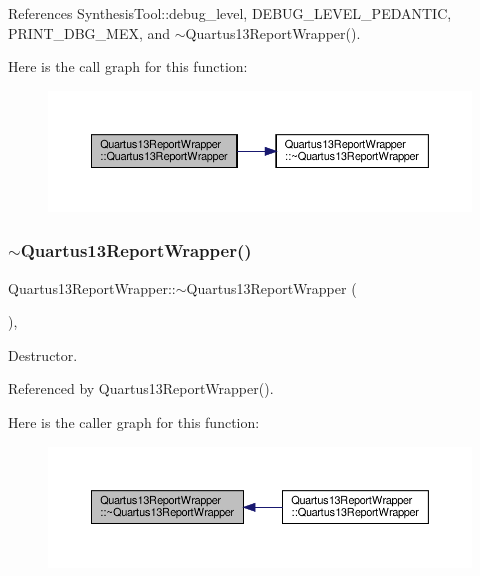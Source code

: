 References Synthesis\+Tool\+::debug\+\_\+level, D\+E\+B\+U\+G\+\_\+\+L\+E\+V\+E\+L\+\_\+\+P\+E\+D\+A\+N\+T\+IC, P\+R\+I\+N\+T\+\_\+\+D\+B\+G\+\_\+\+M\+EX, and $\sim$\+Quartus13\+Report\+Wrapper().

Here is the call graph for this function\+:
\nopagebreak
\begin{figure}[H]
\begin{center}
\leavevmode
\includegraphics[width=350pt]{d5/d0a/classQuartus13ReportWrapper_a3a425105ef70ba5ad1d78ab9f6e2538b_cgraph}
\end{center}
\end{figure}
\mbox{\label{classQuartus13ReportWrapper_a1747b7328bd537869aa4eb4a9d4c4ad7}} 
\subsubsection{\texorpdfstring{$\sim$\+Quartus13\+Report\+Wrapper()}{~Quartus13ReportWrapper()}}
{\footnotesize\ttfamily Quartus13\+Report\+Wrapper\+::$\sim$\+Quartus13\+Report\+Wrapper (\begin{DoxyParamCaption}{ }\end{DoxyParamCaption})\hspace{0.3cm}{\ttfamily [override]}, {\ttfamily [default]}}



Destructor. 



Referenced by Quartus13\+Report\+Wrapper().

Here is the caller graph for this function\+:
\nopagebreak
\begin{figure}[H]
\begin{center}
\leavevmode
\includegraphics[width=350pt]{d5/d0a/classQuartus13ReportWrapper_a1747b7328bd537869aa4eb4a9d4c4ad7_icgraph}
\end{center}
\end{figure}


